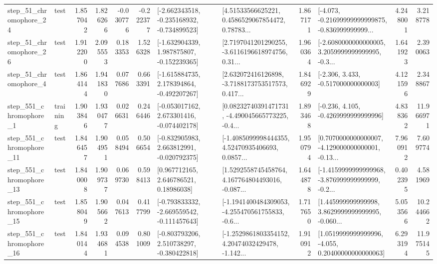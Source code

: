 \begin{tabular}{llrrrrllrlrr}
   step\_51\_chromophore\_24 &      test &      1.857042 &    1.826266 &     -0.030776 & -0.222377 &  [-2.662343518, -0.235168932, -0.734899523] &  [4.51533566625221, 0.4586529067854472, 0.78783... &       1.867171 &  [-4.073, -0.21699999999999875, -0.836999999999... &            4.248001 &          3.218778 \\
   step\_51\_chromophore\_26 &      test &      1.912200 &    2.095553 &      0.183353 &  1.526328 &   [-1.632904339, 1.987875807, -0.152239365] &  [2.7197041201290255, -3.6116196618974756, 0.31... &       1.960364 &  [-2.6080000000000005, 3.2059999999999995, -0.3... &            1.641923 &          2.390063 \\
    step\_51\_chromophore\_4 &      test &      1.864144 &    1.941830 &      0.077686 &  0.663391 &   [-1.615884735, 2.178394864, -0.492207267] &  [2.632072416126898, -3.7188173753517573, 0.417... &       1.846929 &                [-2.306, 3.433, -0.517000000000003] &            4.121596 &          2.348867 \\
   step\_551\_chromophore\_1 &  training &      1.903846 &    1.930477 &      0.026631 &  0.246446 &   [-0.053017162, 2.673301416, -0.074402178] &  [0.08232740391471731, -4.490045665773225, -0.4... &       1.893468 &               [-0.236, 4.105, -0.4269999999999996] &            4.838362 &         11.966971 \\
  step\_551\_chromophore\_11 &      test &      1.846457 &    1.904951 &      0.058494 &  0.506654 &   [-0.832905983, 2.663812991, -0.020792375] &  [-1.4085099998444355, 4.52470935406693, 0.0857... &       1.950794 &  [0.7070000000000007, -4.129000000000001, -0.13... &            7.960912 &          7.609774 \\
  step\_551\_chromophore\_13 &      test &      1.840008 &    1.909737 &      0.069730 &  0.598413 &      [0.967712165, 2.646786521, 0.18986038] &  [1.5292558745458764, 4.167764804493016, -0.087... &       1.644878 &  [-1.4159999999999968, -3.876999999999999, -0.2... &            0.402395 &          4.581969 \\
  step\_551\_chromophore\_15 &      test &      1.858049 &    1.905662 &      0.047613 &  0.417799 &  [-0.793833332, -2.669559542, -0.111457643] &  [-1.1941400484309053, -4.255470561755833, -0.6... &       1.717650 &  [1.445999999999998, 3.8629999999999995, -0.060... &            5.053566 &         10.244662 \\
  step\_551\_chromophore\_16 &      test &      1.840144 &    1.934681 &      0.094538 &  0.801009 &   [-0.803793206, 2.510738297, -0.380422818] &  [-1.2529861803354152, 4.20474032429478, -1.142... &       1.910912 &  [1.0519999999999996, -4.055, 0.20400000000000063] &            6.293194 &         11.975145 \\

\end{tabular}
